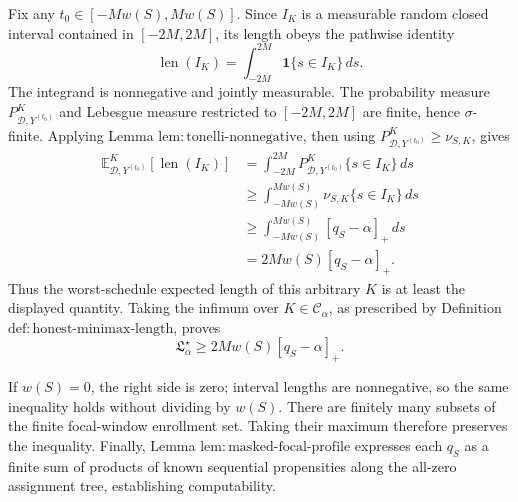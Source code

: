 Fix any \(t_0\in[-Mw(S),Mw(S)]\).  Since \(I_K\) is a measurable random closed interval contained in \([-2M,2M]\), its length obeys the pathwise identity
\[
 \operatorname{len}(I_K)
 =\int_{-2M}^{2M}\mathbf 1\{s\in I_K\}\,ds.
\]
The integrand is nonnegative and jointly measurable.  The probability measure \(P^K_{\mathcal D,Y^{(t_0)}}\) and Lebesgue measure restricted to \([-2M,2M]\) are finite, hence \(\sigma\)-finite.  Applying Lemma \(\mathrm{lem:tonelli\text{-}nonnegative}\), then using \(P^K_{\mathcal D,Y^{(t_0)}}\ge\nu_{S,K}\), gives
\begin{align*}
 \mathbb E^K_{\mathcal D,Y^{(t_0)}}[\operatorname{len}(I_K)]
 &=\int_{-2M}^{2M}
 P^K_{\mathcal D,Y^{(t_0)}}\{s\in I_K\}\,ds\\
 &\ge\int_{-Mw(S)}^{Mw(S)}\nu_{S,K}\{s\in I_K\}\,ds\\
 &\ge\int_{-Mw(S)}^{Mw(S)}[q_S-\alpha]_+\,ds\\
 &=2Mw(S)[q_S-\alpha]_+.
\end{align*}
Thus the worst-schedule expected length of this arbitrary \(K\) is at least the displayed quantity.  Taking the infimum over \(K\in\mathcal C_\alpha\), as prescribed by Definition \(\mathrm{def:honest\text{-}minimax\text{-}length}\), proves
\[
 \mathfrak L_\alpha^\star\ge2Mw(S)[q_S-\alpha]_+.
\]

If \(w(S)=0\), the right side is zero; interval lengths are nonnegative, so the same inequality holds without dividing by \(w(S)\).  There are finitely many subsets of the finite focal-window enrollment set.  Taking their maximum therefore preserves the inequality.  Finally, Lemma \(\mathrm{lem:masked\text{-}focal\text{-}profile}\) expresses each \(q_S\) as a finite sum of products of known sequential propensities along the all-zero assignment tree, establishing computability.

